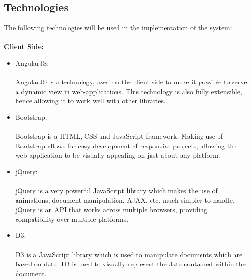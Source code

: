 \subsection{Technologies}
The following technologies will be used in the implementation of the system:\\ \\
{\bfseries Client Side:}
\begin{itemize}
	\item AngularJS: \\ \\
	AngularJS is a technology, used on the client side to make it possible to serve a dynamic view in web-applications. This technology is also fully extensible, hence allowing it to work well with other libraries.
	\item Bootstrap: \\ \\
	Bootstrap is a HTML, CSS and JavaScript framework. Making use of Bootstrap allows for easy development of responsive projects, allowing the web-application to be visually appealing on just about any platform.
	\item jQuery: \\ \\
	jQuery is a very powerful JavaScript library which makes the use of animations, document manipulation, AJAX, etc. much simpler to handle. jQuery is an API that works across multiple browsers, providing compatibility over multiple platforms.
	\item D3: \\ \\
	D3 is a JavaScript library which is used to manipulate documents which are based on data. D3 is used to visually represent the data contained within the document.
\end{itemize}

